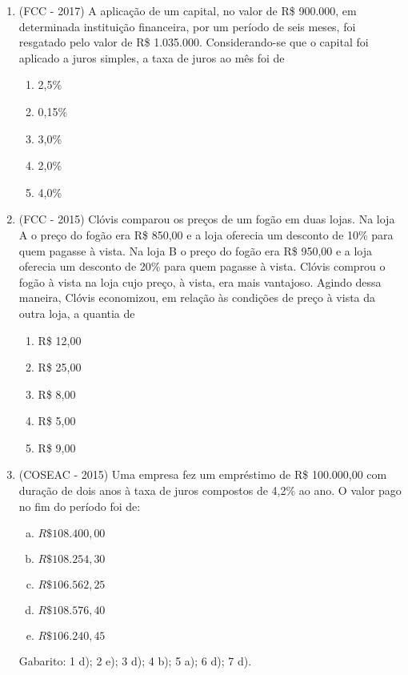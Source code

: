 \begin{enumerate}
  \item (FCC - 2017) A aplicação de um capital, no valor de R\$ 900.000, em determinada instituição financeira, por um período de seis meses, foi resgatado pelo valor de R\$ 1.035.000. Considerando-se que o capital foi aplicado a juros simples, a taxa de juros ao mês foi de 
  \begin{enumerate}
  \item 2,5\%
  \item 0,15\%
  \item 3,0\%
  \item 2,0\%
  \item 4,0\%
  \end{enumerate}
  
  \item (FCC - 2015) Clóvis comparou os preços de um fogão em duas lojas. Na loja A o preço do fogão era R\$ 850,00 e a loja oferecia um desconto de 10\% para quem pagasse à vista. Na loja B o preço do fogão era R\$ 950,00 e a loja oferecia um desconto de 20\% para quem pagasse à vista. Clóvis comprou o fogão à vista na loja cujo preço, à vista, era mais vantajoso. Agindo dessa maneira, Clóvis economizou, em relação às condições de preço à vista da outra loja, a quantia de 
  \begin{enumerate}
  \item R\$ 12,00
  \item R\$ 25,00
  \item R\$ 8,00
  \item R\$ 5,00
  \item R\$ 9,00
  \end{enumerate}
  
    \item (COSEAC - 2015) Uma empresa fez um empréstimo de R\$ 100.000,00 com duração de dois anos à taxa de juros compostos de 4,2\% ao ano. O valor pago no fim do período foi de:
  \begin{enumerate}[a)]
  \item $R\$ 108.400,00$
  \item $R\$ 108.254,30$
  \item $R\$ 106.562,25$
  \item $R\$ 108.576,40$
  \item $R\$ 106.240,45$
  \end{enumerate}

  
 Gabarito: 1 d); 2 e); 3 d); 4 b); 5 a); 6 d); 7 d).
 \end{enumerate}
 
 \newpage
